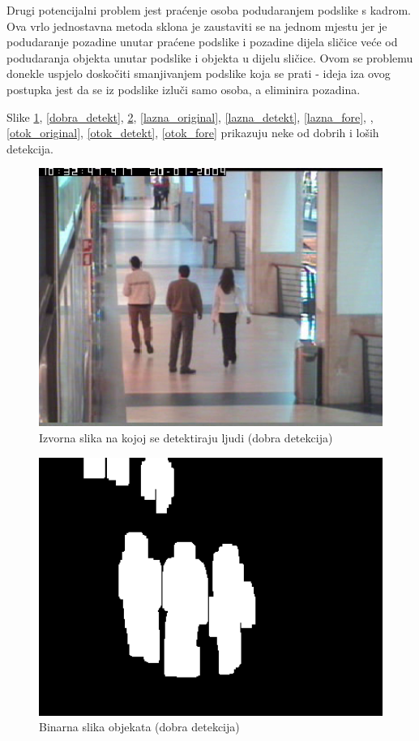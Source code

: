 \documentclass[times, utf8, seminar, numeric]{fer}
\begin{document}
Drugi potencijalni problem jest praćenje osoba podudaranjem podslike s kadrom. Ova vrlo jednostavna metoda sklona je zaustaviti se na jednom mjestu jer je podudaranje pozadine unutar praćene podslike i pozadine dijela sličice veće od podudaranja objekta unutar podslike i objekta u dijelu sličice. Ovom se problemu donekle uspjelo doskočiti smanjivanjem podslike koja se prati - ideja iza ovog postupka jest da se iz podslike izluči samo osoba, a eliminira pozadina. 

Slike \ref{dobra_original}, \ref{dobra_detekt}, \ref{dobra_fore},
\ref{lazna_original}, \ref{lazna_detekt}, \ref{lazna_fore}, 
, \ref{otok_original}, \ref{otok_detekt}, \ref{otok_fore} prikazuju neke od dobrih i loših detekcija.

\begin{figure}
\centering
\includegraphics[width=1\textwidth]{dobra_original.png}
\caption{Izvorna slika na kojoj se detektiraju ljudi (dobra detekcija)}
\label{dobra_original}
\end{figure}

\begin{figure}
\centering
\includegraphics[width=1\textwidth]{dobra_fore.png}
\caption{Binarna slika objekata (dobra detekcija)}
\label{dobra_fore}
\end{figure}
\end{document}
